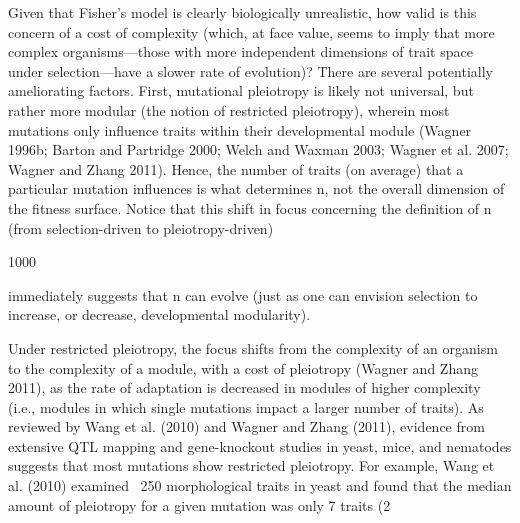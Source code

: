 \documentclass{article}
\begin{document}
Given that Fisher’s model is clearly biologically unrealistic, how valid is this concern of a cost of complexity (which, at face value, seems to imply that more complex organisms—those with more independent dimensions of trait space under selection—have a slower rate of evolution)? There are several potentially ameliorating factors. First, mutational pleiotropy is likely not universal, but rather more modular (the notion of restricted pleiotropy), wherein most mutations only influence traits within their developmental module (Wagner 1996b; Barton and Partridge 2000; Welch and Waxman 2003; Wagner et al. 2007; Wagner and Zhang 2011). Hence, the number of traits (on average) that a particular mutation influences is what determines n, not the overall dimension of the fitness surface. Notice that this shift in focus concerning the definition of n (from selection-driven to pleiotropy-driven)

1000

immediately suggests that n can evolve (just as one can envision selection to increase, or decrease, developmental modularity).

Under restricted pleiotropy, the focus shifts from the complexity of an organism to the complexity of a module, with a cost of pleiotropy (Wagner and Zhang 2011), as the rate of adaptation is decreased in modules of higher complexity (i.e., modules in which single mutations impact a larger number of traits). As reviewed by Wang et al. (2010) and Wagner and Zhang (2011), evidence from extensive QTL mapping and gene-knockout studies in yeast, mice, and nematodes suggests that most mutations show restricted pleiotropy. For example, Wang et al. (2010) examined ~250 morphological traits in yeast and found that the median amount of pleiotropy for a given mutation was only 7 traits (2%
\end{document}

